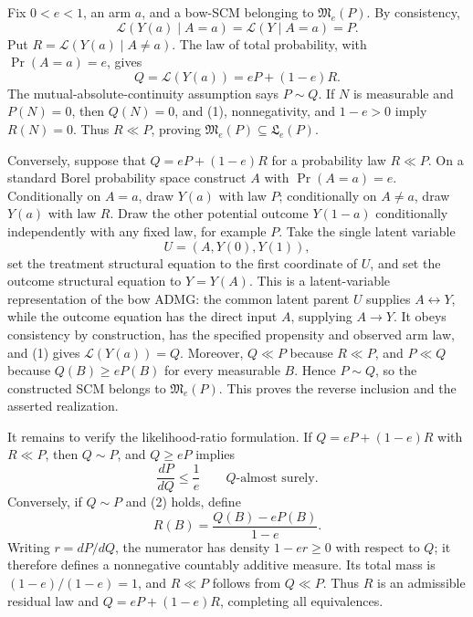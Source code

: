 Fix \(0<e<1\), an arm \(a\), and a bow-SCM belonging to \(\mathfrak M_e(P)\).  By consistency,
\[
 \mathcal L(Y(a)\mid A=a)=\mathcal L(Y\mid A=a)=P.
\]
Put \(R=\mathcal L(Y(a)\mid A\ne a)\).  The law of total probability, with \(\Pr(A=a)=e\), gives
\[
 Q=\mathcal L(Y(a))=eP+(1-e)R. \tag{1}
\]
The mutual-absolute-continuity assumption says \(P\sim Q\).  If \(N\) is measurable and \(P(N)=0\), then \(Q(N)=0\), and (1), nonnegativity, and \(1-e>0\) imply \(R(N)=0\).  Thus \(R\ll P\), proving \(\mathfrak M_e(P)\subseteq\mathfrak L_e(P)\).

Conversely, suppose that \(Q=eP+(1-e)R\) for a probability law \(R\ll P\).  On a standard Borel probability space construct \(A\) with \(\Pr(A=a)=e\).  Conditionally on \(A=a\), draw \(Y(a)\) with law \(P\); conditionally on \(A\ne a\), draw \(Y(a)\) with law \(R\).  Draw the other potential outcome \(Y(1-a)\) conditionally independently with any fixed law, for example \(P\).  Take the single latent variable
\[
 U=(A,Y(0),Y(1)),
\]
set the treatment structural equation to the first coordinate of \(U\), and set the outcome structural equation to \(Y=Y(A)\).  This is a latent-variable representation of the bow ADMG: the common latent parent \(U\) supplies \(A\leftrightarrow Y\), while the outcome equation has the direct input \(A\), supplying \(A\to Y\).  It obeys consistency by construction, has the specified propensity and observed arm law, and (1) gives \(\mathcal L(Y(a))=Q\).  Moreover, \(Q\ll P\) because \(R\ll P\), and \(P\ll Q\) because \(Q(B)\ge eP(B)\) for every measurable \(B\).  Hence \(P\sim Q\), so the constructed SCM belongs to \(\mathfrak M_e(P)\).  This proves the reverse inclusion and the asserted realization.

It remains to verify the likelihood-ratio formulation.  If \(Q=eP+(1-e)R\) with \(R\ll P\), then \(Q\sim P\), and \(Q\ge eP\) implies
\[
 \frac{dP}{dQ}\le \frac1e\qquad Q\text{-almost surely}. \tag{2}
\]
Conversely, if \(Q\sim P\) and (2) holds, define
\[
 R(B)=\frac{Q(B)-eP(B)}{1-e}.
\]
Writing \(r=dP/dQ\), the numerator has density \(1-er\ge0\) with respect to \(Q\); it therefore defines a nonnegative countably additive measure.  Its total mass is \((1-e)/(1-e)=1\), and \(R\ll P\) follows from \(Q\ll P\).  Thus \(R\) is an admissible residual law and \(Q=eP+(1-e)R\), completing all equivalences.